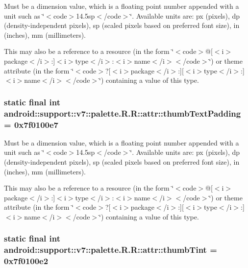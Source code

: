 Must be a dimension value, which is a floating point number appended with a unit such as \char`\"{}$<$code$>$14.5sp$<$/code$>$\char`\"{}. Available units are: px (pixels), dp (density-independent pixels), sp (scaled pixels based on preferred font size), in (inches), mm (millimeters). 

This may also be a reference to a resource (in the form \char`\"{}$<$code$>$@\mbox{[}$<$i$>$package$<$/i$>$:\mbox{]}$<$i$>$type$<$/i$>$:$<$i$>$name$<$/i$>$$<$/code$>$\char`\"{}) or theme attribute (in the form \char`\"{}$<$code$>$?\mbox{[}$<$i$>$package$<$/i$>$:\mbox{]}\mbox{[}$<$i$>$type$<$/i$>$:\mbox{]}$<$i$>$name$<$/i$>$$<$/code$>$\char`\"{}) containing a value of this type. \hypertarget{classandroid_1_1support_1_1v7_1_1palette_1_1_r_1_1attr_48660ce81abe137e3b85196fa53a0602}{
\subsubsection[{thumbTextPadding}]{\setlength{\rightskip}{0pt plus 5cm}static final int android::support::v7::palette.R.R::attr::thumbTextPadding = 0x7f0100e7}}
\label{classandroid_1_1support_1_1v7_1_1palette_1_1_r_1_1attr_48660ce81abe137e3b85196fa53a0602}


Must be a dimension value, which is a floating point number appended with a unit such as \char`\"{}$<$code$>$14.5sp$<$/code$>$\char`\"{}. Available units are: px (pixels), dp (density-independent pixels), sp (scaled pixels based on preferred font size), in (inches), mm (millimeters). 

This may also be a reference to a resource (in the form \char`\"{}$<$code$>$@\mbox{[}$<$i$>$package$<$/i$>$:\mbox{]}$<$i$>$type$<$/i$>$:$<$i$>$name$<$/i$>$$<$/code$>$\char`\"{}) or theme attribute (in the form \char`\"{}$<$code$>$?\mbox{[}$<$i$>$package$<$/i$>$:\mbox{]}\mbox{[}$<$i$>$type$<$/i$>$:\mbox{]}$<$i$>$name$<$/i$>$$<$/code$>$\char`\"{}) containing a value of this type. \hypertarget{classandroid_1_1support_1_1v7_1_1palette_1_1_r_1_1attr_34dd0419798e8ef9241a602c8092b1f4}{
\subsubsection[{thumbTint}]{\setlength{\rightskip}{0pt plus 5cm}static final int android::support::v7::palette.R.R::attr::thumbTint = 0x7f0100e2}}
\label{classandroid_1_1support_1_1v7_1_1palette_1_1_r_1_1attr_34dd0419798e8ef9241a602c8092b1f4}


